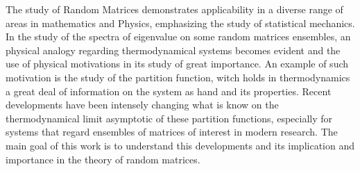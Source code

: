 The study of Random Matrices demonstrates applicability in a diverse range of areas in mathematics and Physics, emphasizing the study of statistical mechanics. In the study of the spectra of eigenvalue on some random matrices ensembles, an physical analogy regarding thermodynamical systems becomes evident and the use of physical motivations in its study of great importance. An example of such motivation is the study of the partition function, witch holds in thermodynamics a great deal of information on the system as hand and its properties. Recent developments have been intensely changing what is know on the thermodynamical limit asymptotic of these partition functions, especially for systems that regard ensembles of matrices of interest in modern research. The main goal of this work is to understand this developments and its implication and importance in the theory of random matrices.
